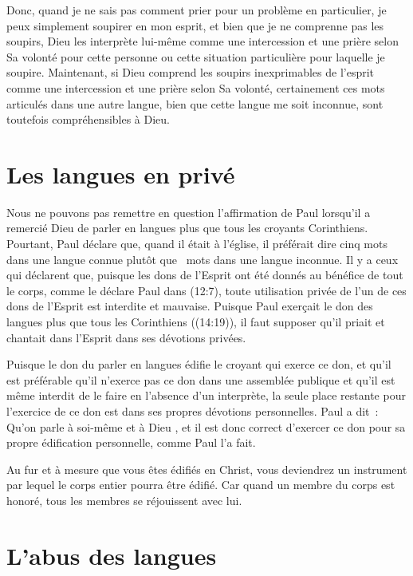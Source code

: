 Donc, quand je ne sais pas comment prier pour un problème en particulier,
 je peux simplement soupirer en mon esprit, et bien que je ne comprenne pas
 les soupirs, Dieu les interprète lui-même comme une intercession
 et une prière selon Sa volonté pour cette personne ou cette situation
 particulière pour laquelle je soupire. Maintenant, si Dieu comprend
 les soupirs inexprimables de l'esprit comme une intercession
 et une prière selon Sa volonté, certainement ces mots articulés
 dans une autre langue, bien que cette langue me soit inconnue,
 sont toutefois compréhensibles à Dieu.


\section{Les langues en priv\'e}

Nous ne pouvons pas remettre en question l'affirmation de Paul lorsqu'il
 a remercié Dieu de parler en langues plus que tous les croyants Corinthiens.
 Pourtant, Paul déclare que, quand il était à l'église, il préférait dire
 cinq mots dans une langue connue plutôt que ~mots
 dans une langue inconnue. Il y a ceux qui déclarent que, puisque les dons
 de l'Esprit ont été donnés au bénéfice de tout le corps, comme le déclare
 Paul dans (12:7), toute utilisation privée
 de l'un de ces dons de l'Esprit est interdite et mauvaise.
 Puisque Paul exerçait le don des langues plus que tous les Corinthiens
 ((14:19)), il faut supposer qu'il priait et chantait
 dans l'Esprit dans ses dévotions privées.

Puisque le don du parler en langues édifie le croyant qui exerce ce don,
 et qu'il est préférable qu'il n'exerce pas ce don dans une assemblée publique
 et qu'il est même interdit de le faire en l'absence d'un interprète,
 la seule place restante pour l'exercice de ce don est dans ses propres
 dévotions personnelles. Paul a dit~:
 \og Qu'on parle à soi-même et à Dieu \fg{}, et il est donc correct
 d'exercer ce don pour sa propre édification personnelle, comme Paul l'a fait.

Au fur et à mesure que vous êtes édifiés en Christ, vous deviendrez
 un instrument par lequel le corps entier pourra être édifié.
 Car quand un membre du corps est honoré, tous les membres
 se réjouissent avec lui.


\section{L'abus des langues}

